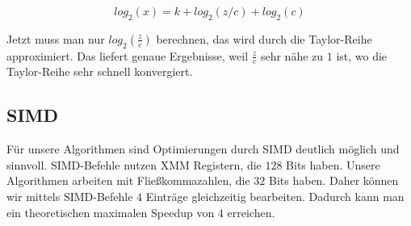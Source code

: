 \[log_2(x) = k + log_2(z/c) + log_2(c)\]

Jetzt muss man nur $log_2(\frac{z}{c})$ berechnen, das wird durch die Taylor-Reihe approximiert. Das liefert genaue Ergebnisse, weil $\frac{z}{c}$ sehr nähe zu $1$ ist, wo die Taylor-Reihe sehr schnell konvergiert. 




\subsection{SIMD}
Für unsere Algorithmen sind Optimierungen durch SIMD deutlich möglich und sinnvoll. SIMD-Befehle nutzen XMM Registern, die $128$ Bits haben. Unsere Algorithmen arbeiten mit Fließkommazahlen, die $32$ Bits haben. Daher können wir mittels SIMD-Befehle $4$ Einträge gleichzeitig bearbeiten. Dadurch kann man ein theoretischen maximalen Speedup von $4$ erreichen.



